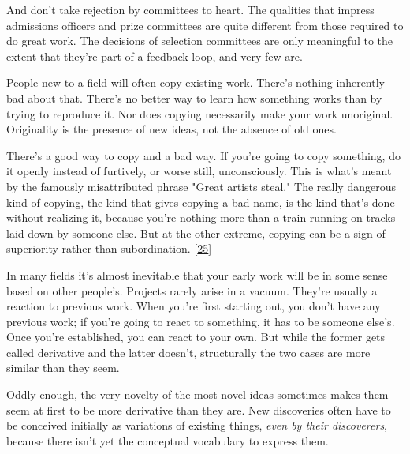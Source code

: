 And don't take rejection by
                  committees to heart. The qualities that impress admissions
                  officers and prize committees are quite different from those
                  required to do great work. The decisions of selection
                  committees are only meaningful to the extent that they're part
                  of a feedback loop, and very few are.






                  People new to a field will often copy existing work. There's
                  nothing inherently bad about that. There's no better way to
                  learn how something works than by trying to reproduce it. Nor
                  does copying necessarily make your work unoriginal.
                  Originality is the presence of new ideas, not the absence of
                  old ones.

There's a good way to copy and a bad way.
                  If you're going to copy something, do it openly instead of
                  furtively, or worse still, unconsciously. This is what's meant
                  by the famously misattributed phrase "Great artists steal."
                  The really dangerous kind of copying, the kind that gives
                  copying a bad name, is the kind that's done without realizing
                  it, because you're nothing more than a train running on tracks
                  laid down by someone else. But at the other extreme, copying
                  can be a sign of superiority rather than subordination.
                  [\href{\#f25n}{25}]

In many fields it's almost inevitable that your
                  early work will be in some sense based on other people's.
                  Projects rarely arise in a vacuum. They're usually a reaction
                  to previous work. When you're first starting out, you don't
                  have any previous work; if you're going to react to something,
                  it has to be someone else's. Once you're established, you can
                  react to your own. But while the former gets called derivative
                  and the latter doesn't, structurally the two cases are more
                  similar than they seem.

Oddly enough, the very
                  novelty of the most novel ideas sometimes makes them seem at
                  first to be more derivative than they are. New discoveries
                  often have to be conceived initially as variations of existing
                  things, \emph{even by their discoverers}, because there isn't
                  yet the conceptual vocabulary to express them.

